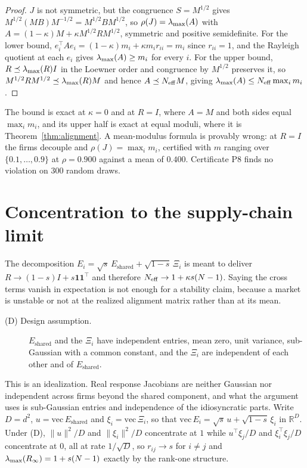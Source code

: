 \begin{proof}
$J$ is not symmetric, but the congruence $S = M^{1/2}$ gives $M^{1/2}(MB)M^{-1/2} = M^{1/2}BM^{1/2}$, so $\rho(J) = \lambda_{\max}(A)$ with $A = (1-\kappa)M + \kappa M^{1/2}RM^{1/2}$, symmetric and positive semidefinite. For the lower bound, $e_i^{\top}Ae_i = (1-\kappa)m_i + \kappa m_i r_{ii} = m_i$ since $r_{ii}=1$, and the Rayleigh quotient at each $e_i$ gives $\lambda_{\max}(A) \geq m_i$ for every $i$. For the upper bound, $R \preceq \lambda_{\max}(R) I$ in the Loewner order and congruence by $M^{1/2}$ preserves it, so $M^{1/2}RM^{1/2} \preceq \lambda_{\max}(R)M$ and hence $A \preceq N_{\mathrm{eff}} M$, giving $\lambda_{\max}(A) \leq N_{\mathrm{eff}} \max_i m_i$.
\end{proof}

The bound is exact at $\kappa=0$ and at $R=I$, where $A=M$ and both sides equal $\max_i m_i$, and its upper half is exact at equal moduli, where it is Theorem~\ref{thm:alignment}. A mean-modulus formula is provably wrong: at $R=I$ the firms decouple and $\rho(J) = \max_i m_i$, certified with $m$ ranging over $\{0.1,\ldots,0.9\}$ at $\rho = 0.900$ against a mean of $0.400$. Certificate P8 finds no violation on 300 random draws.

\section{Concentration to the supply-chain limit}
\label{app:concentration}

The decomposition $E_i = \sqrt{s}\,E_{\text{shared}} + \sqrt{1-s}\,\Xi_i$ is meant to deliver $R \to (1-s)I + s\mathbf{1}\mathbf{1}^{\top}$ and therefore $N_{\mathrm{eff}} \to 1 + \kappa s(N-1)$. Saying the cross terms vanish in expectation is not enough for a stability claim, because a market is unstable or not at the realized alignment matrix rather than at its mean.

\begin{description}
\item[(D) Design assumption.] $E_{\text{shared}}$ and the $\Xi_i$ have independent entries, mean zero, unit variance, sub-Gaussian with a common constant, and the $\Xi_i$ are independent of each other and of $E_{\text{shared}}$.
\end{description}

This is an idealization. Real response Jacobians are neither Gaussian nor independent across firms beyond the shared component, and what the argument uses is sub-Gaussian entries and independence of the idiosyncratic parts. Write $D = d^2$, $u = \mathrm{vec}\,E_{\text{shared}}$ and $\xi_i = \mathrm{vec}\,\Xi_i$, so that $\mathrm{vec}\,E_i = \sqrt{s}\,u + \sqrt{1-s}\,\xi_i$ in $\mathbb{R}^D$. Under (D), $\|u\|^2/D$ and $\|\xi_i\|^2/D$ concentrate at $1$ while $u^{\top}\xi_j/D$ and $\xi_i^{\top}\xi_j/D$ concentrate at $0$, all at rate $1/\sqrt{D}$, so $r_{ij}\to s$ for $i\neq j$ and $\lambda_{\max}(R_\infty) = 1 + s(N-1)$ exactly by the rank-one structure.

